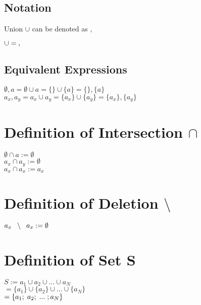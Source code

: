 \documentclass[11pt]{article}
\begin{document}
\subsection{Notation}
Union $\cup$ can be denoted as $,$
\begin{center}
$
\cup = \hspace{.8mm},
$
\end{center}




\subsection{Equivalent Expressions}
\begin{center}
$
\emptyset, a = \emptyset \cup a = \{\} \cup \{a\} = \{\} , \{a\} 
$
\\ \vspace{2mm}
$
a_x,a_y = a_x \cup a_y = \{a_x\} \cup \{a_y\} = \{a_x\},\{a_y\}
$
\end{center}




\section{Definition of Intersection $\cap$}
\begin{center}
$
\emptyset \cap a := \emptyset
$
\\ \vspace{2mm}
$
a_x \cap a_y := \emptyset
$
\\ \vspace{2mm}
$
a_x \cap a_x := a_x
$
\end{center}




\section{Definition of Deletion $\setminus$}
\begin{center}
$
a_x \hspace{2mm}\setminus \hspace{2mm} a_x := \emptyset
$
\end{center}





\section{Definition of Set S}
\begin{center}
$
S := a_1 \cup a_2 \cup ... \cup a_N
$
\\ \vspace{2mm}
$
= \{a_1\} \cup \{a_2\} \cup ... \cup \{a_N\}
$
\\ \vspace{2mm}
$
= \{a_1; \hspace{1mm} a_2; \hspace{1mm} ... \hspace{1mm}; a_N\}
$
\end{center}
\end{document}
